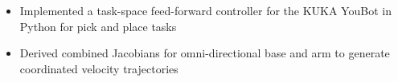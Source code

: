 \documentclass[10pt,a4paper,ragged2e,withhyper]{altacv}
\begin{document}
    \begin{itemize}
        \item Implemented a task-space feed-forward controller for the KUKA YouBot in Python for pick and place tasks
        \item Derived combined Jacobians for omni-directional base and arm to generate coordinated velocity trajectories
    \end{itemize}
\end{document}
